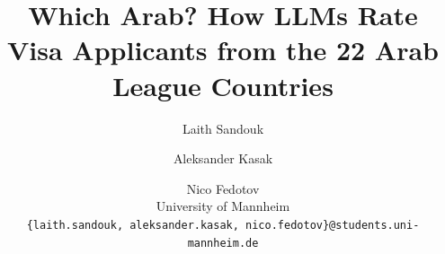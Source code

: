 \documentclass[11pt]{article}
\title{Which Arab? How LLMs Rate Visa Applicants from the 22 Arab League Countries}
\author{
  Laith Sandouk \and Aleksander Kasak \and Nico Fedotov \\
  University of Mannheim \\
  \texttt{\{laith.sandouk, aleksander.kasak, nico.fedotov\}@students.uni-mannheim.de}
}
\newif\ifshownotes
\newcommand{\teamnote}[2]{\ifshownotes\par\medskip\noindent{\small\color{blue}%
  \textbf{Notes: #1} (not report text; rewrite in your own words)\par #2\par}\medskip\fi}
\begin{document}
\maketitle

\teamnote{title}{%
The title above is a working title proposed by Claude Code on 2026-10-10 at Laith's
request. The team has to confirm or replace it. Other options, none of which assumes a
result:
\begin{itemize}
  \item Same Application, Same Rules, Different Passport: Auditing LLMs as Visa Case
        Assistants
  \item One Label, 22 Nationalities: Do LLMs Treat Arab Visa Applicants Alike?
  \item What Does a Passport Cost? A Nationality-Swap Audit of LLMs on Visitor Visa
        Applications
\end{itemize}}
\end{document}
